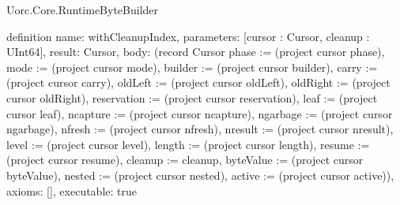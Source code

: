 \begin{lexlean}{Uorc.Core.RuntimeByteBuilder}
\begin{semanticmodule}
definition{
  name: withCleanupIndex,
  parameters: [cursor : Cursor, cleanup : UInt64],
  result: Cursor,
  body: (record Cursor {phase := (project cursor phase), mode := (project cursor mode), builder := (project cursor builder), carry := (project cursor carry), oldLeft := (project cursor oldLeft), oldRight := (project cursor oldRight), reservation := (project cursor reservation), leaf := (project cursor leaf), ncapture := (project cursor ncapture), ngarbage := (project cursor ngarbage), nfresh := (project cursor nfresh), nresult := (project cursor nresult), level := (project cursor level), length := (project cursor length), resume := (project cursor resume), cleanup := cleanup, byteValue := (project cursor byteValue), nested := (project cursor nested), active := (project cursor active)}),
  axioms: [],
  executable: true
}


\end{semanticmodule}
\end{lexlean}
